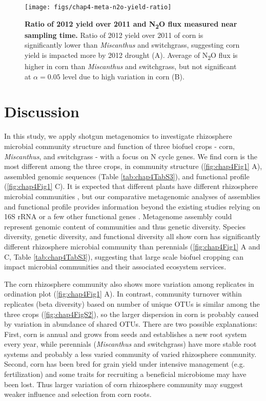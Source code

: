 \documentclass[]{msu-thesis}
\begin{document}
\begin{figure}[tbph!]
  \centering
  \texttt{[image: figs/chap4-meta-n2o-yield-ratio]}
  \caption[Ratio of 2012 yield over 2011 and N\textsubscript{2}O flux
  measured near sampling time]{\textbf{Ratio of 2012 yield over 2011 and
    N\textsubscript{2}O flux measured near sampling time.} Ratio of 2012
    yield over 2011 of corn is significantly lower than
    \textit{Miscanthus} and switchgrass, suggesting corn yield is
    impacted more by 2012 drought (A). Average of N\textsubscript{2}O
    flux is higher in corn than \textit{Miscanthus} and switchgrass, but
  not significant at $\alpha = 0.05$ level due to high variation in corn
(B).}
  \label{fig:chap4FigS11}
\end{figure}


\section{Discussion}

In this study, we apply shotgun metagenomics to investigate rhizosphere
microbial community structure and function of three biofuel crops -
corn, \textit{Miscanthus}, and switchgrass - with a focus on N cycle
genes. We find corn is the most different among the three crops, in
community structure (\ref{fig:chap4Fig1} A), assembled genomic sequences
(Table \ref{tab:chap4TabS3}), and functional profile
(\ref{fig:chap4Fig1} C). It is expected that different plants have
different rhizosphere microbial communities
\cite{smalla_bulk_2001,mao_changes_2011}, but our comparative
metagenomic analyses of assemblies and functional profile provides
information beyond the existing studies relying on 16S rRNA or a few
other functional genes \cite{mao_changes_2011,mao_impact_2013}.
Metagenome assembly could represent genomic content of communities and
thus genetic diversity. Species diversity, genetic diversity, and
functional diversity all show corn has significantly different
rhizosphere microbial community than perennials (\cref{fig:chap4Fig1} A
and C, Table \ref{tab:chap4TabS3}), suggesting that large scale biofuel
cropping can impact microbial communities and their associated ecosystem
services.

The corn rhizosphere community also shows more variation among
replicates in ordination plot (\cref{fig:chap4Fig1} A). In contrast,
community turnover within replicates (beta diversity) based on number of
unique OTUs is similar among the three crops (\cref{fig:chap4FigS2}), so
the larger dispersion in corn is probably caused by variation in
abundance of shared OTUs. There are two possible explanations: First,
corn is annual and grows from seeds and establishes a new root system
every year, while perennials (\textit{Miscanthus} and switchgrass) have
more stable root systems and probably a less varied community of varied
rhizosphere community. Second, corn has been bred for grain yield under
intensive management (e.g. fertilization) and some traits for recruiting
a beneficial microbiome may have been lost. Thus larger variation of
corn rhizosphere community may suggest weaker influence and selection
from corn roots.
\end{document}
